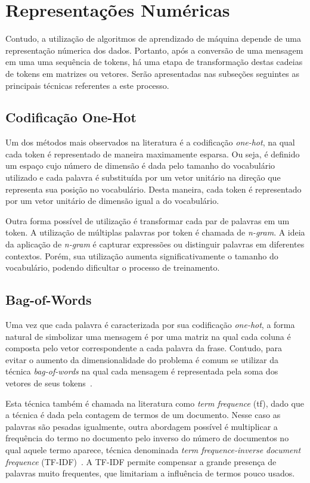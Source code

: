 \section{Representações Numéricas}

Contudo, a utilização de algoritmos de aprendizado de máquina depende de uma representação númerica dos dados.
Portanto, após a conversão de uma mensagem em uma uma sequência de tokens, há uma etapa de transformação destas cadeias
de tokens em matrizes ou vetores.
Serão apresentadas nas subseções seguintes as principais técnicas referentes a este processo.

\subsection{Codificação One-Hot}

Um dos métodos mais observados na literatura é a codificação \textit{one-hot}, na qual cada token é representado de
maneira maximamente esparsa.
Ou seja, é definido um espaço cujo número de dimensão é dada pelo tamanho do vocabulário utilizado e cada palavra é
substituída por um vetor unitário na direção que representa sua posição no vocabulário.
Desta maneira, cada token é representado por um vetor unitário de dimensão igual a do vocabulário.

Outra forma possível de utilização é transformar cada par de palavras em um token.
A utilização de múltiplas palavras por token é chamada de \textit{n-gram}.
A ideia da aplicação de \textit{n-gram} é capturar expressões ou distinguir palavras em diferentes contextos.
Porém, sua utilização aumenta significativamente o tamanho do vocabulário, podendo dificultar o processo de treinamento.

\subsection{Bag-of-Words}

Uma vez que cada palavra é caracterizada por sua codificação \textit{one-hot}, a forma natural de simbolizar uma mensagem
é por uma matriz na qual cada coluna é composta pelo vetor correspondente a cada palavra da frase.
Contudo, para evitar o aumento da dimensionalidade do problema é comum se utilizar da técnica \textit{bag-of-words} na
qual cada mensagem é representada pela soma dos vetores de seus tokens~\cite{schutze08}.

Esta técnica também é chamada na literatura como \textit{term frequence} (tf), dado que a técnica é dada pela contagem
de termos de um documento.
Nesse caso as palavras são pesadas igualmente, outra abordagem possível é multiplicar a frequência do termo no documento
pelo inverso do número de documentos no qual aquele termo aparece, técnica denominada \textit{term frequence-inverse
document frequence} (TF-IDF)~\cite{salton88}.
A TF-IDF permite compensar a grande presença de palavras muito frequentes, que limitariam a influência de termos pouco
usados.


